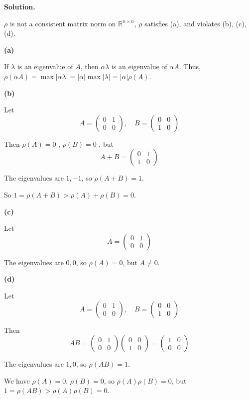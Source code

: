 \documentclass[12pt, a4paper, oneside]{ctexart}
\newenvironment{solution}{\par\noindent\textbf{Solution. }}{\par}
\begin{document}
\begin{solution}

$\rho$ is not a consistent matrix norm on $\mathbb{R}^{n\times n}$, $\rho$ satisfies (a), and violates (b), (c), (d).

\textbf{(a)}

If $ \lambda $ is an eigenvalue of $ A $, then $ \alpha\lambda $ is an eigenvalue of $ \alpha A $. Thus, $ \rho(\alpha A)=\max|\alpha\lambda| = |\alpha|\max|\lambda|=|\alpha|\rho(A) $.

\vspace{12pt}

\textbf{(b)}

Let
$$
A=\begin{pmatrix}0&1\\0&0\end{pmatrix}, \quad B=\begin{pmatrix}0&0\\1&0\end{pmatrix}
$$

Then $ \rho(A) = 0 $ , $ \rho(B)=0 $ , but
$$
A + B=\begin{pmatrix}0&1\\1&0\end{pmatrix}
$$

The eigenvalues are $ 1, - 1 $, so $ \rho(A + B)=1 $.

So $ 1=\rho(A + B)>\rho(A)+\rho(B)= 0 $.

\vspace{12pt}

\textbf{(c)}

Let
$$
A=\begin{pmatrix}0&1\\0&0\end{pmatrix}
$$

The eigenvalues are $ 0,0 $, so $ \rho(A)=0 $, but $ A\neq0 $.

\vspace{12pt}

\textbf{(d)}

Let
$$
A=\begin{pmatrix}0&1\\0&0\end{pmatrix}, \quad B=\begin{pmatrix}0&0\\1&0\end{pmatrix}
$$

Then
$$
AB=\begin{pmatrix}0&1\\0&0\end{pmatrix}\begin{pmatrix}0&0\\1&0\end{pmatrix}=\begin{pmatrix}1&0\\0&0\end{pmatrix}
$$

The eigenvalues are $ 1,0 $, so $ \rho(AB)=1 $.

We have $ \rho(A)=0 $, $ \rho(B)=0 $, so $ \rho(A)\rho(B)=0 $, but $ 1=\rho(AB)>\rho(A)\rho(B)=0 $.

\end{solution}
\end{document}
